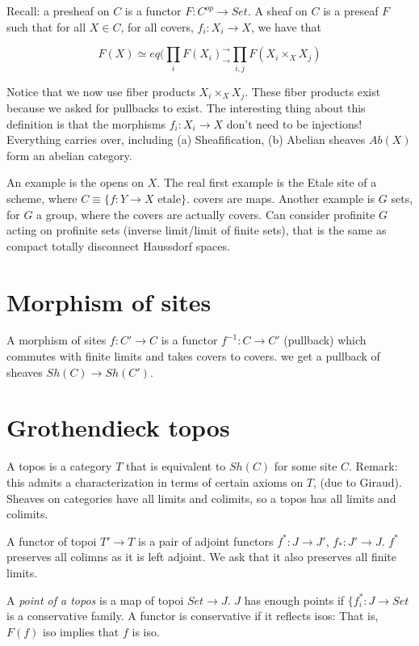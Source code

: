 \documentclass[11pt]{book}
\begin{document}
Recall: a presheaf on $C$ is a functor $F: C^{op} \rightarrow Set$. A sheaf on $C$ is a preseaf $F$
such that for all $X \in C$, for all covers, $f_i: X_i \rightarrow X$,  we have that

$$F(X) \simeq eq(\prod_i F(X_i)^\rightarrow_\rightarrow \prod_{i, j}F(X_i \times_X X_j)$$

Notice that we now use fiber products $X_i \times_X X_j$. These fiber products exist
because we asked for pullbacks to exist.  The interesting thing about this definition
is that the morphisms $f_i: X_i \rightarrow X$ don't need to be injections!
Everything carries over, including (a) Sheafification, (b) Abelian sheaves
$Ab(X)$ form an abelian category. 

An example is the opens on $X$. The real first
example is the Etale site of a scheme, where $C \equiv \{ f: Y \rightarrow X \text{ etale} \}$.
covers are maps. Another example is $G$ sets, for $G$ a group, where the covers are actually covers.
Can consider profinite $G$ acting on profinite sets (inverse limit/limit of finite sets), that is the same
as compact totally disconnect Haussdorf spaces.

\section{Morphism of sites}

A morphism of sites $f: C' \rightarrow C$ is a functor $f^{-1}: C \rightarrow C'$ (pullback)
which commutes with finite limits and takes covers to covers. we get a pullback of sheaves
$Sh(C) \rightarrow Sh(C')$.

\section{Grothendieck topos}

A topos is a category $T$ that is equivalent to $Sh(C)$ for some site $C$.
Remark: this admits a characterization in terms of certain axioms on $T$, (due to Giraud).
Sheaves on categories have all limits and colimits, so a topos has all limits and colimits.

A functor of topoi $T' \rightarrow T$ is a pair of adjoint functors $f^*: J \rightarrow J'$,
$f_*: J' \rightarrow J$. $f^*$ preserves all colimns as it is left adjoint. We ask that it also
preserves all finite limits. 

A \emph{point of a topos} is a map of topoi $Set \rightarrow J$. $J$ has enough points if
$\{ f_i^*: J \rightarrow {Set}$ is a conservative family. A functor is conservative if it
reflects isos: That is, $F(f)$ iso implies that $f$ is iso.
\end{document}
